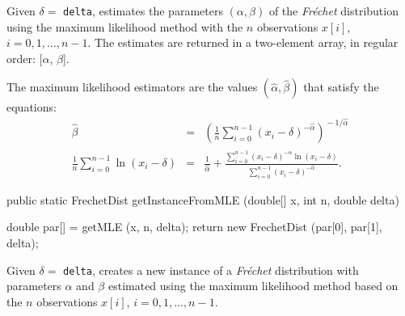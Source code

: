 \begin{tabb}
   Given $\delta =$ \texttt{delta}, estimates the parameters $(\alpha, \beta)$
  of the \emph{Fr\'echet} distribution
   using the maximum likelihood method with the $n$ observations
   $x[i]$, $i = 0, 1,\ldots, n-1$. The estimates are returned in a two-element
    array, in regular order: [$\alpha$, $\beta$].
   \begin{detailed}
   The maximum likelihood estimators are the values $(\hat\alpha, \hat\beta)$
   that satisfy the equations:
   \begin{eqnarray*}
      \hat\beta & = &  \left(\frac1n \sum_{i=0}^{n-1} (x_i - \delta)^{-\hat\alpha}\right)^{\!\!-1/\hat\alpha} \\[0.5em]
  \frac1n \sum_{i=0}^{n-1} \ln(x_i - \delta)  & = &   \frac 1 {\hat\alpha}  +
                              \frac{\sum_{i=0}^{n-1} (x_i - \delta)^{-\hat\alpha}\ln(x_i - \delta)}
                               {\sum_{i=0}^{n-1} (x_i - \delta)^{-\hat\alpha}}.
   \end{eqnarray*}
   \end{detailed}
\end{tabb}
\begin{htmlonly}
\end{htmlonly}
\begin{code}

   public static FrechetDist getInstanceFromMLE (double[] x, int n,
                                                 double delta)\begin{hide} {
      double par[] = getMLE (x, n, delta);
      return new FrechetDist (par[0], par[1], delta);
   }\end{hide}
\end{code}
\begin{tabb}
Given $\delta =$ \texttt{delta}, creates a new instance of a \emph{Fr\'echet}
distribution with parameters $\alpha$ and $\beta$ estimated using the
maximum likelihood method based on the $n$ observations $x[i]$,
$i = 0, 1, \ldots, n-1$.
\end{tabb}
\begin{htmlonly}
\end{htmlonly}
